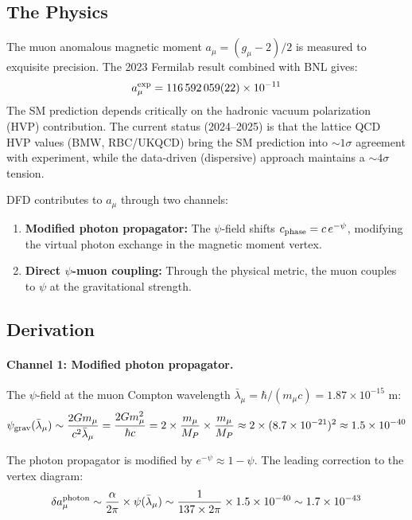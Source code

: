 \documentclass[11pt]{article}
\begin{document}
\subsection{The Physics}

The muon anomalous magnetic moment $a_\mu = (g_\mu - 2)/2$ is measured
to exquisite precision.  The 2023 Fermilab result combined with BNL gives:
\begin{equation}
a_\mu^{\rm exp} = 116\,592\,059(22) \times 10^{-11}
\end{equation}
The SM prediction depends critically on the hadronic vacuum polarization
(HVP) contribution.  The current status (2024--2025) is that the
lattice QCD HVP values (BMW, RBC/UKQCD) bring the SM prediction
into $\sim 1\sigma$ agreement with experiment, while the
data-driven (dispersive) approach maintains a $\sim 4\sigma$ tension.

DFD contributes to $a_\mu$ through two channels:
\begin{enumerate}
\item \textbf{Modified photon propagator:} The $\psi$-field shifts
  $c_{\rm phase} = c\,e^{-\psi}$, modifying the virtual photon
  exchange in the magnetic moment vertex.
\item \textbf{Direct $\psi$-muon coupling:} Through the physical
  metric, the muon couples to $\psi$ at the gravitational strength.
\end{enumerate}

\subsection{Derivation}

\paragraph{Channel 1: Modified photon propagator.}
The $\psi$-field at the muon Compton wavelength
$\bar\lambda_\mu = \hbar/(m_\mu c) = 1.87 \times 10^{-15}$ m:
\begin{equation}
\psi_{\rm grav}(\bar\lambda_\mu) \sim \frac{2Gm_\mu}{c^2\bar\lambda_\mu}
= \frac{2Gm_\mu^2}{\hbar c}
= 2 \times \frac{m_\mu}{M_P} \times \frac{m_\mu}{M_P}
\approx 2 \times (8.7 \times 10^{-21})^2
\approx 1.5 \times 10^{-40}
\end{equation}

The photon propagator is modified by $e^{-\psi} \approx 1 - \psi$.
The leading correction to the vertex diagram:
\begin{equation}
\delta a_\mu^{\rm photon} \sim \frac{\alpha}{2\pi} \times \psi(\bar\lambda_\mu)
\sim \frac{1}{137 \times 2\pi} \times 1.5 \times 10^{-40}
\sim 1.7 \times 10^{-43}
\end{equation}
\end{document}
